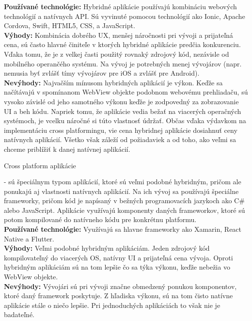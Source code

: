 \begin{itemize}[leftmargin=*]
{\bf Používané technológie:} Hybridné aplikácie používajú kombináciu webových technológií a natívnych API. Sú vyvinuté pomocou technológií ako Ionic, Apache Cordova, Swift, HTML5, CSS, a JavaScript.  \\

{\bf Výhody:} Kombinácia dobrého UX, menšej náročnosti pri vývoji a prijateľná cena, sú často hlavné činiteľe v ktorých hybridné aplikácie predčia konkurenciu. Vďaka tomu, že je z velkej časti použitý rovnaký zdrojový kód, nezávisle od mobilného operančého systému. Na vývoj je potrebných menej vývojárov (napr. nemusia byť zvlášť tímy vývojárov pre iOS a zvlášť pre Android).  \\
 
{\bf Nevýhody: }  Najvačším mínusom hybridných aplikácií je výkon. Keďže sa načítávajú v spomínanom WebView objekte podobnom webovému prehliadaču, sú vysoko závislé od jeho samotného výkonu keďže je zodpovedný za zobrazovanie UI a beh kódu. Napriek tomu, že aplikácie vedia bežať na viacerých operačných systémoch, je vcelku náročné si túto vlastnosť údržať. Občas vďaka výdavkom na implementáciu cross platformingu, vie cena hybridnej aplikácie dosiahnuť ceny natívnych aplikácií. Všetko však záleží od požiadaviek a od toho, ako veľmi sa chceme priblížiť k danej natívnej aplikácií.\\


{\bf \item Cross platform aplikácie} - sú špeciálnym typom aplikácií, ktoré sú veľmi podobné hybridným, pričom ale ponukajú aj vlastnosti natívnych aplikácií. Na ich vývoj sa používajú špeciálne frameworky, pričom kód je napísaný v bežných programovacích jazykoch ako C\# alebo JavaScript. Aplikácie využívajú komponenty daných frameworkov, ktoré sú potom kompilované do natívneho kódu pre konkrétnu platformu. \\


{\bf Používané technológie:} Využívajú sa hlavne frameworky ako Xamarin, React Native a Flutter.  \\

{\bf Výhody:} Veľmi podobné hybridným aplikáciám. Jeden zdrojový kód kompilovateľný do viacerých OS, natívny UI a prijateľná cena vývoja. Oproti hybridným aplikáciám sú na tom lepšie čo sa týka výkonu, keďže nebežia vo WebView objekte.  \\
 
{\bf Nevýhody:} Vývojári sú pri vývoji značne obmedzený ponukou komponentov, ktoré daný framework poskytuje. Z hľadiska výkonu,  sú na tom čisto natívne aplikácie stále o niečo lepšie. Pri jednoduchých aplikáciách to však nie je badateľné.  \\
\end{itemize}


